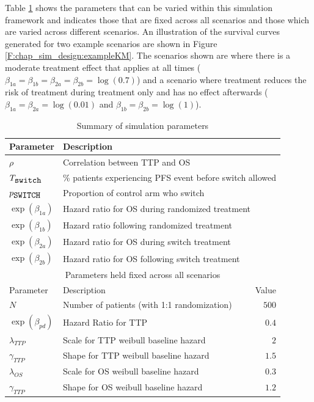 Table \ref{T:chap_sim_design:parms} shows the parameters that can be varied within this simulation framework and indicates those that are fixed across all scenarios and those which are varied across different scenarios. An illustration of the survival curves generated for two example scenarios are shown in Figure \ref{F:chap_sim_design:exampleKM}. The scenarios shown are where there is a moderate treatment effect that applies at all times ($\beta_{1a}=\beta_{1b}=\beta_{2a}=\beta_{2b}=\log(0.7)$) and a scenario where treatment reduces the risk of treatment during treatment only and has no effect afterwards ($\beta_{1a}=\beta_{2a}=\log(0.01)$ and $\beta_{1b}=\beta_{2b}=\log(1)$). 


\begin{table}[ht] 
\caption{Summary of simulation parameters}
\centering 
\begin{tabular}{ l l r}
\hline
\hline
Parameter & \multicolumn{2}{l}{Description}  \\
\hline
$\rho$    & \multicolumn{2}{l}{Correlation between TTP and OS} \\
$T_{\verb+switch+}$ & \multicolumn{2}{l}{\% patients experiencing PFS event before switch allowed}  \\
$p_{\verb+SWITCH+}$ & \multicolumn{2}{l}{Proportion of control arm who switch} \\
$\exp(\beta_{1a})$ & \multicolumn{2}{l}{Hazard ratio for OS during randomized treatment} \\  
$\exp(\beta_{1b})$ & \multicolumn{2}{l}{Hazard ratio following randomized treatment}     \\
$\exp(\beta_{2a})$ & \multicolumn{2}{l}{Hazard ratio for OS during switch treatment}     \\  
$\exp(\beta_{2b})$ & \multicolumn{2}{l}{Hazard ratio for OS following switch treatment}  \\
\hline
\multicolumn{3}{c}{Parameters held fixed across all scenarios} \\
Parameter & Description & Value  \\
\hline 
$N$ & Number of patients (with 1:1 randomization) & $500$  \\
$\exp(\beta_{pd})$ & Hazard Ratio for TTP & $0.4$  \\
$\lambda_{TTP}$ & Scale for TTP weibull baseline hazard & $2$     \\ 
$\gamma_{TTP}$  & Shape for TTP weibull baseline hazard & $1.5$  \\
$\lambda_{OS}$ & Scale for OS weibull baseline hazard  & $0.3$   \\ 
$\gamma_{TTP}$ & Shape for OS weibull baseline hazard & $1.2$   \\
\hline
\end{tabular} 
\label{T:chap_sim_design:parms}
\end{table}


